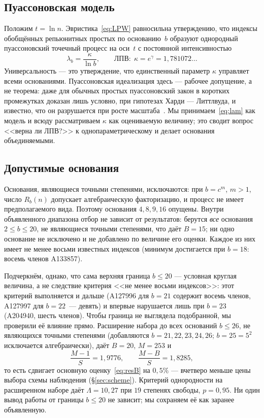 \documentclass[11pt,a4paper]{article}
\theoremstyle{plain}
\theoremstyle{remark}
\newcommand{\Rb}{R_b}
\newcommand{\eg}{e^{\gamma}}
\begin{document}
\subsection{Пуассоновская модель}
Положим $t=\ln n$. Эвристика~\eqref{eq:LPW} равносильна утверждению, что индексы
обобщённых репьюнитных простых по основанию~$b$ образуют однородный пуассоновский
точечный процесс на оси~$t$ с постоянной интенсивностью
\begin{equation}\label{eq:lam}
\lambda_b=\frac{\kappa}{\ln b},\qquad \text{ЛПВ:}\ \ \kappa=\eg=1{,}781072\ldots
\end{equation}
Универсальность --- это утверждение, что единственный параметр $\kappa$ управляет всеми
основаниями. Пуассоновская идеализация здесь --- рабочее допущение, а не теорема:
даже для обычных простых пуассоновский закон в коротких промежутках доказан лишь
условно, при гипотезах Харди --- Литтлвуда, и известно, что он разрушается при росте
масштаба~\cite{jha2026}. Мы принимаем~\eqref{eq:lam} как модель и всюду рассматриваем
$\kappa$ как оцениваемую величину; это сводит вопрос <<верна ли ЛПВ?>> к однопараметрическому и
делает основания объединяемыми.

\subsection{Допустимые основания}\label{sec:bases}
Основания, являющиеся точными степенями, исключаются: при $b=c^{m}$, $m>1$, число
$\Rb(n)$ допускает алгебраическую факторизацию, и процесс не имеет предполагаемого вида.
Поэтому основания $4,8,9,16$ опущены. Внутри объявленного диапазона отбор
не зависит от результатов: берутся \emph{все} основания $2\le b\le20$, не являющиеся
точными степенями, что даёт $B=15$; ни одно основание не исключено и не добавлено
по величине его оценки. Каждое из них имеет не менее восьми известных индексов
(минимум достигается при $b=18$: восемь членов A133857).

Подчеркнём, однако, что сама верхняя граница $b\le20$ --- условная круглая величина,
а не следствие критерия <<не менее восьми индексов>>: этот критерий выполняется и
дальше (A127996 для $b=21$ содержит восемь членов, A127997 для $b=22$~--- девять) и
впервые нарушается лишь при $b=23$ (A204940, шесть членов). Чтобы граница не выглядела
подобранной, мы проверили её влияние прямо. Расширение набора до всех оснований
$b\le26$, не являющихся точными степенями (добавляются $b=21,22,23,24,26$; $b=25=5^2$
исключается алгебраически), даёт $B=20$, $M=253$ и
\[
  \frac{M-1}{S}=1{,}9776,\qquad \frac{M-B}{S}=1{,}8285,
\]
то есть сдвигает основную оценку~\eqref{eq:resB} на $0{,}5\%$ --- вчетверо меньше
цены выбора схемы наблюдения (\S\ref{sec:scheme}). Критерий однородности на расширенном
наборе даёт $\Lambda=10{,}27$ при $19$ степенях свободы, $p=0{,}95$. Ни один вывод
работы от границы $b\le20$ не зависит; мы сохраняем её как заранее объявленную.
\end{document}
